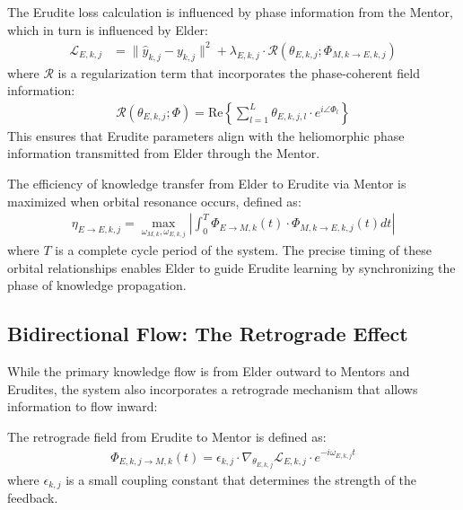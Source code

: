 \begin{theorem}
The Erudite loss calculation is influenced by phase information from the Mentor, which in turn is influenced by Elder:
\begin{align}
\mathcal{L}_{E,k,j} &= \|\hat{y}_{k,j} - y_{k,j}\|^2 + \lambda_{E,k,j} \cdot \mathcal{R}(\theta_{E,k,j}; \Phi_{M,k \rightarrow E,k,j})
\end{align}
where $\mathcal{R}$ is a regularization term that incorporates the phase-coherent field information:
\begin{align}
\mathcal{R}(\theta_{E,k,j}; \Phi) = \text{Re}\left\{\sum_{l=1}^L \theta_{E,k,j,l} \cdot e^{i\angle \Phi_l}\right\}
\end{align}
This ensures that Erudite parameters align with the heliomorphic phase information transmitted from Elder through the Mentor.
\end{theorem}

\begin{theorem}
The efficiency of knowledge transfer from Elder to Erudite via Mentor is maximized when orbital resonance occurs, defined as:
\begin{align}
\eta_{E \rightarrow E,k,j} = \max_{\omega_{M,k}, \omega_{E,k,j}} \left| \int_0^T \Phi_{E \rightarrow M,k}(t) \cdot \Phi_{M,k \rightarrow E,k,j}(t) dt \right|
\end{align}
where $T$ is a complete cycle period of the system. The precise timing of these orbital relationships enables Elder to guide Erudite learning by synchronizing the phase of knowledge propagation.
\end{theorem}

\subsection{Bidirectional Flow: The Retrograde Effect}

While the primary knowledge flow is from Elder outward to Mentors and Erudites, the system also incorporates a retrograde mechanism that allows information to flow inward:

\begin{definition}
The retrograde field from Erudite to Mentor is defined as:
\begin{align}
\Phi_{E,k,j \rightarrow M,k}(t) = \epsilon_{k,j} \cdot \nabla_{\theta_{E,k,j}}\mathcal{L}_{E,k,j} \cdot e^{-i\omega_{E,k,j}t}
\end{align}
where $\epsilon_{k,j}$ is a small coupling constant that determines the strength of the feedback.
\end{definition}

